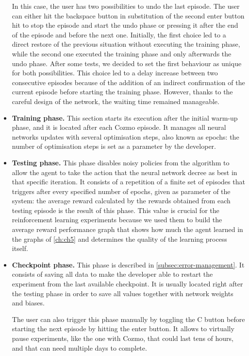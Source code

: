 \begin{itemize}
          In this case, the user has two possibilities to undo the last episode.
          The user can either hit the backspace button in substitution of the second enter button hit to stop the episode and start the undo phase or pressing it after the end of the episode and before the next one.
          Initially, the first choice led to a direct restore of the previous situation without executing the training phase, while the second one executed the training phase and only afterwards the undo phase.
          After some tests, we decided to set the first behaviour as unique for both possibilities.
          This choice led to a delay increase between two consecutive episodes because of the addition of an indirect confirmation of the current episode before starting the training phase. However, thanks to the careful design of the network, the waiting time remained manageable.
    \item \textbf{Training phase.} This section starts its execution after the initial warm-up phase, and it is located after each Cozmo episode.
          It manages all neural networks updates with several optimisation steps, also known as epochs: the number of optimisation steps is set as a parameter by the developer.
    \item \textbf{Testing phase.} This phase disables noisy policies from the algorithm to allow the agent to take the action that the neural network decree as best in that specific iteration.
          It consists of a repetition of a finite set of episodes that triggers after every specified number of epochs, given as parameter of the system: the average reward calculated by the rewards obtained from each testing episode is the result of this phase.
          This value is crucial for the reinforcement learning experiments because we used them to build the average reward performance graph that shows how much the agent learned in the graphs of \vref{ch:ch5} and determines the quality of the learning process itself.
    \item \textbf{Checkpoint phase.} This phase is described in \vref{subsec:error-management}.
          It consists of saving all data to make the developer able to restart the experiment from the last available checkpoint.
          It is usually located right after the testing phase in order to save all values together with network weights and biases.

          The user can also trigger this phase manually by toggling the C button before starting the next episode by hitting the enter button.
          It allows to virtually pause experiments, like the one with Cozmo, that could last tens of hours, and that can need multiple days to complete.
\end{itemize}



